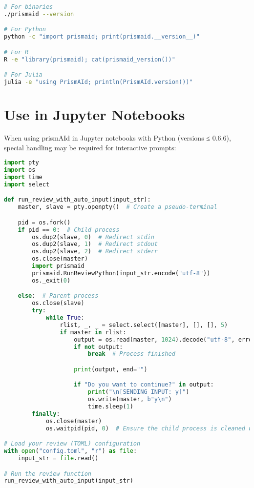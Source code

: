 \begin{commandbox}
\begin{lstlisting}[language=Bash]
# For binaries
./prismaid --version

# For Python
python -c "import prismaid; print(prismaid.__version__)"

# For R
R -e "library(prismaid); cat(prismaid_version())"

# For Julia
julia -e "using PrismAId; println(PrismAId.version())"
\end{lstlisting}
\end{commandbox}

\section{Use in Jupyter Notebooks}

When using prismAId in Jupyter notebooks with Python (versions ≤ 0.6.6), special handling may be required for interactive prompts:

\begin{commandbox}
\begin{lstlisting}[language=Python]
import pty
import os
import time
import select

def run_review_with_auto_input(input_str):
    master, slave = pty.openpty()  # Create a pseudo-terminal

    pid = os.fork()
    if pid == 0:  # Child process
        os.dup2(slave, 0)  # Redirect stdin
        os.dup2(slave, 1)  # Redirect stdout
        os.dup2(slave, 2)  # Redirect stderr
        os.close(master)
        import prismaid
        prismaid.RunReviewPython(input_str.encode("utf-8"))
        os._exit(0)

    else:  # Parent process
        os.close(slave)
        try:
            while True:
                rlist, _, _ = select.select([master], [], [], 5)
                if master in rlist:
                    output = os.read(master, 1024).decode("utf-8", errors="ignore")
                    if not output:
                        break  # Process finished

                    print(output, end="")

                    if "Do you want to continue?" in output:
                        print("\n[SENDING INPUT: y]")
                        os.write(master, b"y\n")
                        time.sleep(1)
        finally:
            os.close(master)
            os.waitpid(pid, 0)  # Ensure the child process is cleaned up

# Load your review (TOML) configuration
with open("config.toml", "r") as file:
    input_str = file.read()

# Run the review function
run_review_with_auto_input(input_str)
\end{lstlisting}
\end{commandbox}

